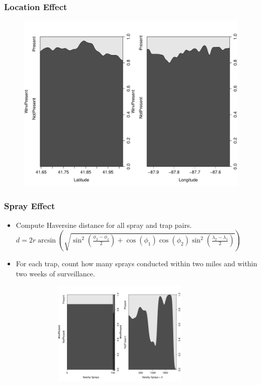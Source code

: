 \documentclass[handout]{beamer}
\begin{document}
\begin{frame}
\frametitle{Location Effect}
\begin{figure}[H] \center
\includegraphics[scale=.30]{CD_LatLong.pdf}
\end{figure}
\end{frame}

\begin{frame}
\frametitle{Spray Effect}
\begin{itemize}
\item Compute Haversine distance for all spray and trap pairs.
${\scriptstyle d = 2 r \arcsin\left(\sqrt{\sin^2\left(\frac{\phi_2 - \phi_1}{2}\right) + \cos(\phi_1) \cos(\phi_2)\sin^2\left(\frac{\lambda_2 - \lambda_1}{2}\right)}\right)} $
\item For each trap, count how many sprays conducted within two miles and within two weeks of surveillance.
\end{itemize}
\begin{figure}[H] \center
\includegraphics[height=5cm, width=10cm]{CD_NearbySpraysVSwnv.pdf}
\end{figure}
\end{frame}
\end{document}
